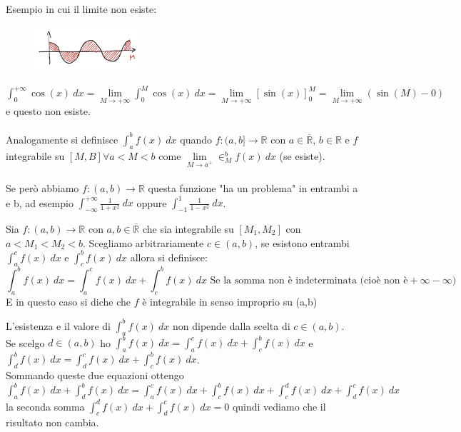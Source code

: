 \begin{example}
Esempio in cui il limite non esiste: 
\end{example}
\begin{figure}
    \vspace{-25pt}
    \centering
    \includegraphics[width=4cm]{images/esempio-integrale-improprio-3.png}
\end{figure}
$\int_0^{+\infty}\cos(x)\:dx = \lim\limits_{M\to +\infty}\int_0^M\cos(x)\:dx = \lim\limits_{M\to +\infty}[\sin(x)]_0^M = \lim\limits_{M\to +\infty}(\sin(M)-0)$ e questo non esiste.\\\\

\hspace{-15pt}Analogamente si definisce $\int_a^b f(x)\:dx$ quando $f:(a,b] \to \mathbb{R}$ con $a \in \mathbb{\overline{R}}$, $b\in \mathbb{R}$ e $f$ integrabile su $[M,B] \forall a < M < b$ come $\lim\limits_{M\to a^+}\in_M^b f(x) \:dx$ (se esiste).\\\\
Se però abbiamo $f:(a,b)\to \mathbb{R}$ questa funzione "ha un problema" in entrambi a e b, ad esempio $\int_{-\infty}^{+\infty}\frac{1}{1+x^2}\:dx$ oppure $\int_{-1}^1 \frac{1}{1-x^2}\:dx$.

\begin{definition}
Sia $f: (a,b)\to \mathbb{R}$ con $a,b \in \mathbb{\overline{R}}$ che sia integrabile su $[M_1,M_2]$ con $a<M_1<M_2<b$. Scegliamo arbitrariamente $c\in (a,b)$, se esistono entrambi $\int_a^c f(x)\:dx$ e $\int_c^b f(x)\:dx$ allora si definisce:
\[\int_a^b f(x)\:dx = \int_a^c f(x)\:dx + \int_c^b f(x)\:dx \text{ Se la somma non è indeterminata (cioè non è} +\infty-\infty)\]
E in questo caso si diche che $f$ è integrabile in senso improprio su (a,b)
\end{definition}

\begin{observation}
L'esistenza e il valore di $\int_a^b f(x) \:dx$ non dipende dalla scelta di $c\in (a,b)$.\\
Se scelgo $d\in (a,b)$ ho $\int_a^b f(x)\:dx = \int_a^c f(x)\:dx + \int_c^b f(x)\:dx$ e $\int_d^b f(x)\:dx = \int_d^c f(x)\:dx + \int_c^b f(x)\:dx$.\\
Sommando queste due equazioni ottengo $\int_a^b f(x)\:dx + \int_d^b f(x)\:dx = \int_a^c f(x)\:dx + \int_c^b f(x)\:dx + \int_c^d f(x)\:dx + \int_d^c f(x)\:dx$ la seconda somma $\int_c^d f(x)\:dx + \int_d^c f(x)\:dx = 0$ quindi vediamo che il risultato non cambia.
\end{observation}

